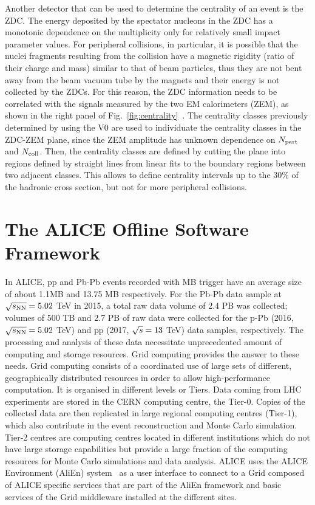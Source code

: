 Another detector that can be used to determine the centrality of an event is the ZDC.
The energy deposited by the spectator nucleons in the ZDC has a monotonic dependence
on the multiplicity only for relatively small impact parameter values. For peripheral collisions, in particular,
it is possible that the nuclei fragments resulting from the collision have a magnetic rigidity (ratio
of their charge and mass) similar to that of beam particles, thus they are not bent away from the beam vacuum tube 
by the magnets and their energy is not
collected by the ZDCs. For this reason, the ZDC information needs to be correlated with the signals measured
by the two EM calorimeters (ZEM), as shown in the right panel of Fig.~\ref{fig:centrality}~\cite{Abelev:2013qoq}. 
The centrality classes previously determined 
by using the V0 are used to individuate the centrality classes in the ZDC-ZEM plane, since the ZEM
amplitude has unknown dependence on $N_{\rm part}$ and $N_{\rm coll}$. Then, the centrality classes 
are defined by cutting the plane into regions defined by straight lines from linear fits to the boundary regions
between two adjacent classes. This allows to define centrality intervals up to the 30\% of the hadronic cross section,
but not for more peripheral collisions.


\section{The ALICE Offline Software Framework}
\label{sec:offline}
In ALICE, pp and Pb-Pb events recorded with MB trigger have an average size of about 1.1MB and 13.75 MB respectively. 
For the Pb-Pb data sample at $\sqrt{s_{\rm NN}}=5.02$ TeV in 2015, a total raw data volume of 2.4 PB was collected; volumes of 500 TB and 2.7 PB
of raw data were collected for the p-Pb (2016, $\sqrt{s_{\rm NN}}=5.02$ TeV) and pp (2017, $\sqrt{s}=13$ TeV) data samples, respectively.
 The processing and analysis of these data necessitate 
unprecedented amount of computing and storage resources. Grid computing provides 
the answer to these needs. Grid computing consists of a coordinated use of large sets 
of different, geographically distributed resources in order to allow high-performance 
computation. It is organised in different levels or Tiers. Data coming from LHC experiments 
are stored in the CERN computing centre, the Tier-0. Copies of the collected data are then 
replicated in large regional computing centres (Tier-1), which also contribute in the event 
reconstruction and Monte Carlo simulation. Tier-2 centres are computing centres located
 in different institutions which do not have large storage capabilities but provide a large 
 fraction of the computing resources for Monte Carlo simulations and 
 data analysis. ALICE uses the ALICE Environment (AliEn) system~\cite{Saiz:2003wi} as a 
 user interface to connect to a Grid composed of ALICE specific services that are part 
 of the AliEn framework and basic services of the Grid middleware installed at the different sites.

